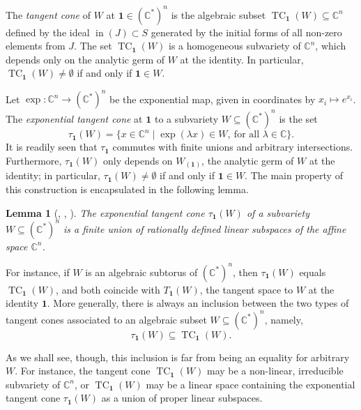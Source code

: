 \documentclass{article}
\numberwithin{equation}{section}
\newtheorem{lemma}[theorem]{Lemma}
\theoremstyle{definition}
\renewcommand{\C}{\mathbb{C}}
\DeclareMathOperator{\init}{in}
\DeclareMathOperator{\TC}{TC}
\newcommand{\one}{\mathbf{1}}
\begin{document}
The {\em tangent cone}\/ of $W$ at $\one \in (\C^*)^n$ is the algebraic 
subset $\TC_{\one}(W)\subseteq \C^n$ defined by the ideal 
$\init(J)\subset S$ generated by the initial forms of 
all non-zero elements from $J$.  The set 
$\TC_{\one}(W)$ is a homogeneous subvariety of $\C^n$, 
which depends only on the analytic germ of $W$ at 
the identity.  In particular, $\TC_{\one}(W)\ne \emptyset$ 
if and only if $\one\in W$.  

Let $\exp\colon \C^n \to (\C^*)^n$ be the exponential map, 
given in coordinates by $x_i\mapsto e^{x_i}$.  
The {\em exponential tangent cone}\/ at $\one$ 
to a subvariety $W\subseteq (\C^*)^n$ is the set  
\begin{equation}
\label{eq:tau1}
\tau_{\one}(W)= \{ x\in \C^n \mid \exp(\lambda x)\in W,\ 
\text{for all $\lambda \in \C$} \}.
\end{equation}
It is readily seen that $\tau_{\one}$ commutes with finite unions and 
arbitrary intersections. Furthermore, $\tau_{\one}(W)$ only depends 
on $W_{(\one)}$, the analytic germ of $W$ at the identity; in particular, 
$\tau_{\one}(W)\ne \emptyset$ if and only if $\one\in W$.  The main 
property of this construction is encapsulated in the following lemma.

\begin{lemma}[\cite{DPS-duke}, \cite{Su-imrn}, \cite{SYZ}] 
\label{lem:exp-tcone}
The exponential tangent cone $\tau_{\one}(W)$  of a subvariety 
$W\subseteq (\C^*)^n$ is a finite union of rationally defined linear 
subspaces of the affine space $\C^n$.  
\end{lemma}
 
For instance, if $W$ is an algebraic subtorus of $(\C^{*})^n$,  
then $\tau_{\one}(W)$ equals $\TC_{\one}(W)$, and both 
coincide with $T_{\one}(W)$, 
the tangent space to $W$ at the identity $\one$. 
More generally, there is always an inclusion between the two 
types of tangent cones associated to an  algebraic subset 
$W\subseteq (\C^{*})^n$, namely, 
\begin{equation}
\label{eq:ttinc}
\tau_{\one}(W)\subseteq \TC_{\one}(W). 
\end{equation}

As we shall see, though, this inclusion is far from being an equality 
for arbitrary $W$. For instance, the tangent cone $\TC_{\one}(W)$ may 
be a non-linear, irreducible subvariety of $\C^n$, or $\TC_{\one}(W)$ 
may be a linear space containing the exponential tangent cone 
$\tau_{\one}(W)$ as a union of proper linear subspaces.
\end{document}
